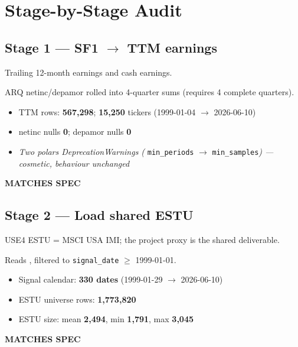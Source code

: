 \documentclass[11pt,a4paper]{article}
\newcommand{\PASS}[1]{\textcolor{pass}{\textbf{#1}}}
\newcommand{\NOTE}[1]{\textcolor{note}{\textit{#1}}}
\begin{document}
\section{Stage-by-Stage Audit}

\subsection{Stage 1 --- SF1 $\to$ TTM earnings}

\begin{description}[style=nextline]
  \item[PDF SPEC] Trailing 12-month earnings and cash earnings.
  \item[Implementation] ARQ netinc/depamor rolled into 4-quarter sums (requires 4 complete quarters).
  \item[Observed]\phantom{x}
    \begin{itemize}[nosep, topsep=-\parskip]
      \item TTM rows: \textbf{567{,}298}; \textbf{15{,}250} tickers (1999-01-04 $\to$ 2026-06-10)
      \item netinc nulls \textbf{0}; depamor nulls \textbf{0}
      \item \NOTE{Two polars DeprecationWarnings (} \texttt{min\_periods} \NOTE{$\to$} \texttt{min\_samples}\NOTE{) --- cosmetic, behaviour unchanged}
    \end{itemize}
  \item[Status] \PASS{MATCHES SPEC}
\end{description}

\subsection{Stage 2 --- Load shared ESTU}

\begin{description}[style=nextline]
  \item[PDF SPEC] USE4 ESTU = MSCI USA IMI; the project proxy is the shared  deliverable.
  \item[Implementation] Reads , filtered to \texttt{signal\_date} $\geq$ 1999-01-01.
  \item[Observed]\phantom{x}
    \begin{itemize}[nosep, topsep=-\parskip]
      \item Signal calendar: \textbf{330 dates} (1999-01-29 $\to$ 2026-06-10)
      \item ESTU universe rows: \textbf{1{,}773{,}820}
      \item ESTU size: mean \textbf{2{,}494}, min \textbf{1{,}791}, max \textbf{3{,}045}
    \end{itemize}
  \item[Status] \PASS{MATCHES SPEC}
\end{description}
\end{document}
